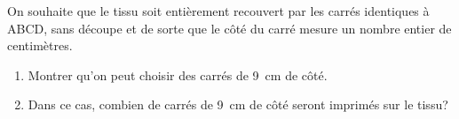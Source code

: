 \documentclass[10pt]{article}
\begin{document}
\begin{enumerate}
On souhaite que le tissu soit entièrement recouvert par les carrés identiques à ABCD, sans découpe et de sorte que le côté du carré mesure un nombre entier de centimètres.
	\begin{enumerate}
		\item Montrer qu'on peut choisir des carrés de 9~cm de côté.
		\item Dans ce cas, combien de carrés de 9~cm de côté seront imprimés sur le tissu?
	\end{enumerate}
\end{enumerate}

\bigskip
\end{document}

